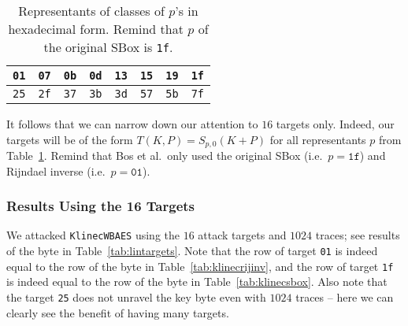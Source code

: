 \begin{table}[h]
	\begin{center}
	\begin{tabular}{| c | c | c | c | c | c | c | c |}
		\hline
		{\tt 01} & {\tt 07} & {\tt 0b} & {\tt 0d} & {\tt 13} & {\tt 15} & {\tt 19} & {\tt 1f} \\
		\hline
		{\tt 25} & {\tt 2f} & {\tt 37} & {\tt 3b} & {\tt 3d} & {\tt 57} & {\tt 5b} & {\tt 7f} \\
		\hline
	\end{tabular}
	\end{center}
\caption{Representants of classes of $p$'s in hexadecimal form. Remind that $p$ of the original SBox is {\tt 1f}.}
\label{tab:classrepre}
\end{table}

It follows that we can narrow down our attention to $16$ targets only. Indeed, our targets will be of the form $T(K,P) = S_{p,0}(K+P)$ for all representants $p$ from Table~\ref{tab:classrepre}. Remind that Bos et al.\ only used the original SBox (i.e.\ $p = \texttt{1f}$) and Rijndael inverse (i.e.\ $p = \texttt{01}$).

\subsubsection{Results Using the 16 Targets}
	
	We attacked {\tt KlinecWBAES} using the $16$ attack targets and $1024$ traces; see results of the  byte in Table~\ref{tab:lintargets}. Note that the row of target {\tt 01} is indeed equal to the row of the  byte in Table~\ref{tab:klinecrijinv}, and the row of target {\tt 1f} is indeed equal to the row of the  byte in Table~\ref{tab:klinecsbox}. Also note that the target {\tt 25} does not unravel the  key byte even with $1024$ traces -- here we can clearly see the benefit of having many targets.
	


